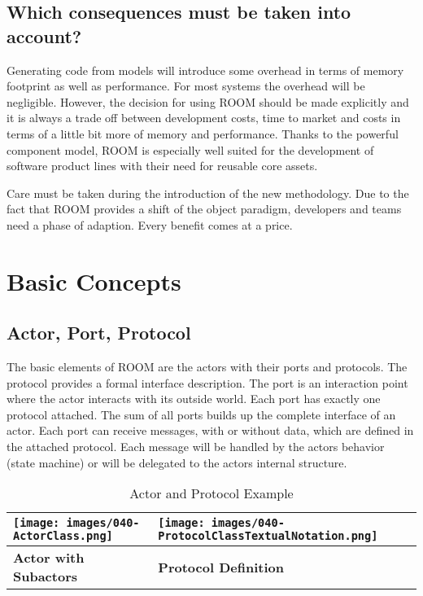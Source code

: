 \subsection{Which consequences must be taken into account?}

Generating code from models will introduce some overhead in terms of memory footprint as well as performance. For most systems the overhead will be negligible. However, the decision for using ROOM should be made explicitly and it is always a trade off between development costs, time to market and costs in terms of a little bit more of memory and performance. Thanks to the powerful component model, ROOM is especially well suited for the development of software product lines with their need for reusable core assets.  
  
Care must be taken during the introduction of the new methodology. Due to the fact that ROOM provides a shift of the object paradigm, developers and teams need a phase of adaption. Every benefit comes at a price.

\section{Basic Concepts}

\subsection{Actor, Port, Protocol}

The basic elements of ROOM are the actors with their ports and protocols. The protocol provides a formal interface description. The port is an interaction point where the actor interacts with its outside world. Each port has exactly one protocol attached. The sum of all ports builds up the complete interface of an actor. Each port can receive messages, with or without data, which are defined in the attached protocol. Each message will be handled by the actors behavior (state machine) or will be delegated to the actors internal structure.

\begin{table}
\caption{Actor and Protocol Example}
\begin{tabular}{|l|l|}
\hline
\texttt{[image: images/040-ActorClass.png]} & \texttt{[image: images/040-ProtocolClassTextualNotation.png]} \\ \hline
\textbf{Actor with Subactors} & \textbf{Protocol Definition} \\ \hline
\end{tabular}
\end{table}

